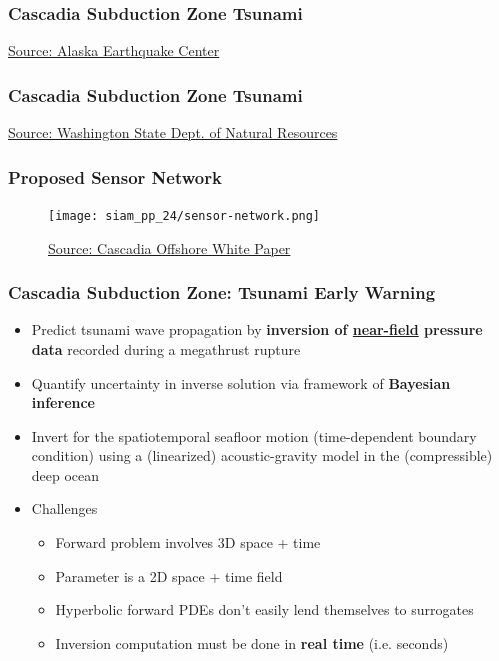 \begin{frame}
    \frametitle{Cascadia Subduction Zone Tsunami}
    \caption{\href{https://www.youtube.com/watch?v=WuTbDnd_8nA}{Source: Alaska Earthquake Center}}
\end{frame}

\begin{frame}
    \frametitle{Cascadia Subduction Zone Tsunami}
    \caption{\href{https://www.youtube.com/watch?v=e5PJQW_6k6M}{Source: Washington State Dept. of Natural Resources}}
\end{frame}

\begin{frame}
    \frametitle{Proposed Sensor Network}
    \begin{figure}
        \texttt{[image: siam\_pp\_24/sensor-network.png]}
        \caption{\href{http://cascadiaoffshore.org/story/White_Paper.html}{Source: Cascadia Offshore White Paper}}
    \end{figure}
\end{frame}

\begin{frame}
    \frametitle{Cascadia Subduction Zone: Tsunami Early Warning}
    \begin{itemize}
        \item Predict tsunami wave propagation by \textbf{inversion of \underline{near-field} pressure data} recorded during a megathrust rupture
        \item Quantify uncertainty in inverse solution via framework of \textbf{Bayesian inference}
        \item Invert for the spatiotemporal seafloor motion (time-dependent boundary condition) using a (linearized) acoustic-gravity model in the (compressible) deep ocean
        \item Challenges
        \begin{itemize}
            \item Forward problem involves 3D space + time
            \item Parameter is a 2D space + time field
            \item Hyperbolic forward PDEs don't easily lend themselves to surrogates
            \item Inversion computation must be done in \textbf{real time} (i.e. seconds)
        \end{itemize}
    \end{itemize}
\end{frame}

